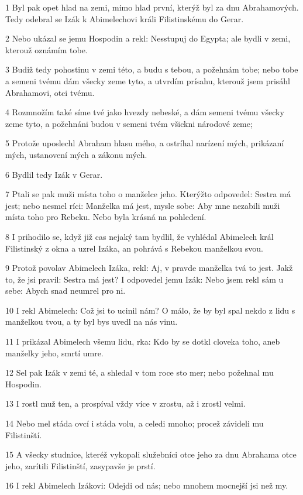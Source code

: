 \par 1 Byl pak opet hlad na zemi, mimo hlad první, kterýž byl za dnu Abrahamových. Tedy odebral se Izák k Abimelechovi králi Filistinskému do Gerar.
\par 2 Nebo ukázal se jemu Hospodin a rekl: Nesstupuj do Egypta; ale bydli v zemi, kterouž oznámím tobe.
\par 3 Budiž tedy pohostinu v zemi této, a budu s tebou, a požehnám tobe; nebo tobe a semeni tvému dám všecky zeme tyto, a utvrdím prísahu, kterouž jsem prisáhl Abrahamovi, otci tvému.
\par 4 Rozmnožím také síme tvé jako hvezdy nebeské, a dám semeni tvému všecky zeme tyto, a požehnáni budou v semeni tvém všickni národové zeme;
\par 5 Protože uposlechl Abraham hlasu mého, a ostríhal narízení mých, prikázaní mých, ustanovení mých a zákonu mých.
\par 6 Bydlil tedy Izák v Gerar.
\par 7 Ptali se pak muži místa toho o manželce jeho. Kterýžto odpovedel: Sestra má jest; nebo nesmel ríci: Manželka má jest, mysle sobe: Aby mne nezabili muži místa toho pro Rebeku. Nebo byla krásná na pohledení.
\par 8 I prihodilo se, když již cas nejaký tam bydlil, že vyhlédal Abimelech král Filistinský z okna a uzrel Izáka, an pohrává s Rebekou manželkou svou.
\par 9 Protož povolav Abimelech Izáka, rekl: Aj, v pravde manželka tvá to jest. Jakž to, že jsi pravil: Sestra má jest? I odpovedel jemu Izák: Nebo jsem rekl sám u sebe: Abych snad neumrel pro ni.
\par 10 I rekl Abimelech: Což jsi to ucinil nám? O málo, že by byl spal nekdo z lidu s manželkou tvou, a ty byl bys uvedl na nás vinu.
\par 11 I prikázal Abimelech všemu lidu, rka: Kdo by se dotkl cloveka toho, aneb manželky jeho, smrtí umre.
\par 12 Sel pak Izák v zemi té, a shledal v tom roce sto mer; nebo požehnal mu Hospodin.
\par 13 I rostl muž ten, a prospíval vždy více v zrostu, až i zrostl velmi.
\par 14 Nebo mel stáda ovcí i stáda volu, a celedi mnoho; procež závideli mu Filistinští.
\par 15 A všecky studnice, kteréž vykopali služebníci otce jeho za dnu Abrahama otce jeho, zarítili Filistinští, zasypavše je prstí.
\par 16 I rekl Abimelech Izákovi: Odejdi od nás; nebo mnohem mocnejší jsi než my.
